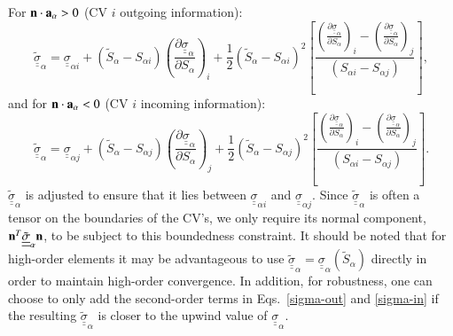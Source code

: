 \documentclass[preprint,authoryear,12pt]{elsarticle}
\newcommand{\frc}{\displaystyle\frac}
\begin{document}
For ${\bf n}\cdot {\bf a}_\alpha>0$ (CV $i$ outgoing information):
\begin{equation}
  \underline{\underline{\tilde{\sigma}}}_{\alpha} = \underline{\underline{\sigma}}_{\alpha i} + \left(\tilde{S}_{\alpha}-S_{\alpha i}\right) \left(\frc{\partial \underline{\underline{\sigma}}_{\alpha}}{\partial S_{\alpha}}\right)_{i} + \frc{1}{2}\left(\tilde{S}_{\alpha}-S_{\alpha i}\right)^{2} \left[ \frc{ \left(\frc{\partial \underline{\underline{\sigma}}_{\alpha}}{\partial S_{\alpha}}\right)_{i} - \left(\frc{\partial \underline{\underline{\sigma}}_{\alpha}}{\partial S_{\alpha}}\right)_{j} } { \left(S_{\alpha i}-S_{\alpha j}\right) } \right],
  \label{sigma-out}
\end{equation}
and for ${\bf n}\cdot {\bf a}_\alpha<0$ (CV $i$ incoming information):
\begin{equation}
  \underline{\underline{\tilde{\sigma}}}_{\alpha} = \underline{\underline{\sigma}}_{\alpha j} + \left(\tilde{S}_{\alpha}-S_{\alpha j}\right) \left(\frc{\partial \underline{\underline{\sigma}}_{\alpha}}{\partial S_{\alpha}}\right)_{j} + \frc{1}{2}\left(\tilde{S}_{\alpha}-S_{\alpha j}\right)^{2} \left[ \frc{ \left(\frc{\partial \underline{\underline{\sigma}}_{\alpha}}{\partial S_{\alpha}}\right)_{i} - \left(\frc{\partial \underline{\underline{\sigma}}_{\alpha}}{\partial S_{\alpha}}\right)_{j} } { \left(S_{\alpha i}-S_{\alpha j}\right) } \right].
  \label{sigma-in}
\end{equation}
$\underline{\underline{\tilde{\sigma}}}_{\alpha}$ is adjusted to ensure that it lies between $\underline{\underline{\sigma}}_{\alpha i}$ and $\underline{\underline{\sigma}}_{\alpha j}$. Since $\underline{\underline{\tilde{\sigma}}}_{\alpha}$ is often a tensor on the boundaries of the CV's, we only require its normal component, ${\bf n}^{T}\underline{\underline{\tilde{\sigma}}}_{\alpha}{\bf n}$, to be subject to this boundedness constraint. It should be noted that for high-order elements it may be advantageous to use $\underline{\underline{\tilde{\sigma}}}_{\alpha} = \underline{\underline{\sigma}}_{\alpha}\left(\tilde{S}_{\alpha}\right)$ directly in order to maintain high-order convergence. In addition, for robustness, one can choose to only add the second-order terms in Eqs.~\ref{sigma-out} and \ref{sigma-in} if the resulting $\underline{\underline{\tilde{\sigma}}}_{\alpha}$ is closer to the upwind value of $\underline{\underline{\sigma}}_{\alpha}$.
\end{document}

